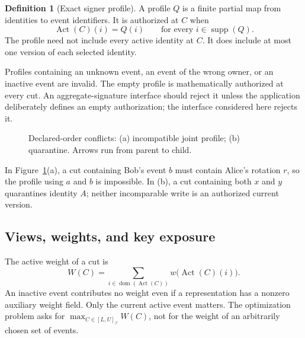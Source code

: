 \documentclass[11pt]{article}
\theoremstyle{definition}
\newtheorem{definition}[theorem]{Definition}
\newcommand{\Id}{\mathcal I}
\newcommand{\Act}{\operatorname{Act}}
\newcommand{\supp}{\operatorname{supp}}
\begin{document}
\begin{definition}[Exact signer profile]
A profile $Q$ is a finite partial map from identities to event identifiers. It is authorized at $C$ when
\[
 \Act(C)(i)=Q(i)\qquad\text{for every }i\in\supp(Q).
\]
The profile need not include every active identity at $C$. It does include at most one version of each selected identity.
\end{definition}

Profiles containing an unknown event, an event of the wrong owner, or an inactive event are invalid. The empty profile is mathematically authorized at every cut. An aggregate-signature interface should reject it unless the application deliberately defines an empty authorization; the interface considered here rejects it.

\begin{figure}[t]
\centering
{}

\caption{Declared-order conflicts: (a) incompatible joint profile; (b) quarantine. Arrows run from parent to child.}
\label{fig:conflicts}
\end{figure}

In Figure~\ref{fig:conflicts}(a), a cut containing Bob's event $b$ must
contain Alice's rotation $r$, so the profile using $a$ and $b$ is impossible.
In (b), a cut containing both $x$ and $y$ quarantines identity $A$; neither
incomparable write is an authorized current version.

\subsection{Views, weights, and key exposure}
The active weight of a cut is
\[
 W(C)=\sum_{i\in\operatorname{dom}(\Act(C))}w\bigl(\Act(C)(i)\bigr).
\]
An inactive event contributes no weight even if a representation has a nonzero auxiliary weight field. Only the current active event matters. The optimization problem asks for $\max_{C\in[L,U]_{\Id}}W(C)$, not for the weight of an arbitrarily chosen set of events.
\end{document}
